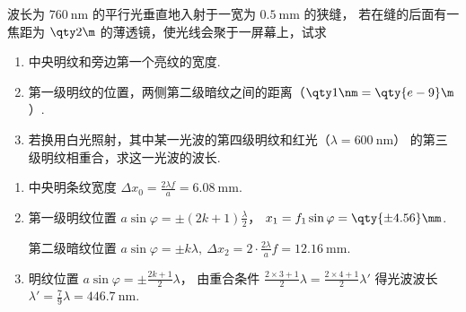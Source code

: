 \begin{problem}[本题8分]
  波长为 $\qty{760}\nm$ 的平行光垂直地入射于一宽为 $\qty{0.5}\mm$ 的狭缝，
  若在缝的后面有一焦距为 $\qty2\m$ 的薄透镜，使光线会聚于一屏幕上，试求
\begin{enumerate}
  \item 中央明纹和旁边第一个亮纹的宽度.
  \item 第一级明纹的位置，两侧第二级暗纹之间的距离（$\qty1\nm = \qty{e-9}\m$）.
  \item 若换用白光照射，其中某一光波的第四级明纹和红光（$\lambda = \qty{600}\nm$）
  的第三级明纹相重合，求这一光波的波长.
\end{enumerate}
\end{problem}
\scratch[4ex]
\begin{solution}\leavevmode
  \begin{enumerate}
    \item 中央明条纹宽度 $\Delta x_0 = \frac{2\lambda f}{a} = \qty{6.08}\mm$.
    \item 第一级明纹位置 $a\sin\varphi = \pm(2k + 1)\frac\lambda2$，
    $x_1 = f_1\sin\varphi = \qty{\pm 4.56}\mm$.
        
    第二级暗纹位置
    $ a\sin\varphi = \pm k\lambda,~
      \Delta x_2 = 2 \cdot \frac{2\lambda}{a}f = \qty{12.16}\mm$.
    \item 明纹位置 $a\sin\varphi = \pm\frac{2k + 1}{2}\lambda$，
    由重合条件
    $\frac{2 \times 3 + 1}{2}\lambda = \frac{2 \times 4 + 1}{2}\lambda'$
    得光波波长 $\lambda' = \frac79\lambda = \qty{446.7}\nm$.
  \end{enumerate}
\end{solution}
